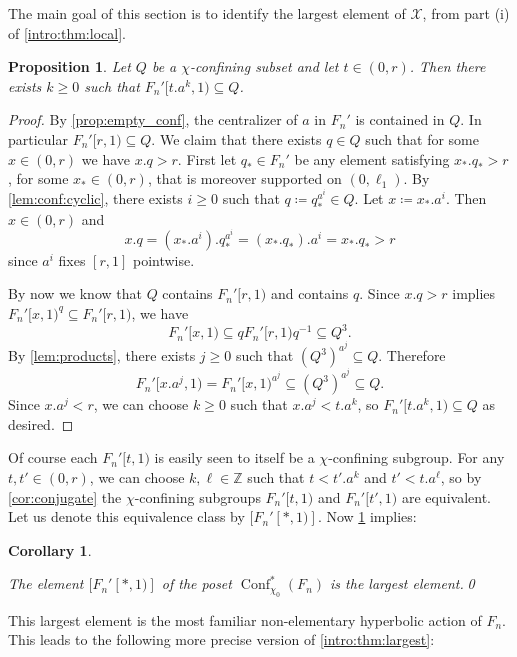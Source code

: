 \documentclass[reqno,12pt]{amsart}\setcounter{tocdepth}{1}
\newtheorem{proposition}[theorem]{Proposition}
\newtheorem{corollary}[theorem]{Corollary}
\theoremstyle{definition}
\newcommand{\Z}{\mathbb{Z}}
\DeclareMathOperator{\Conf}{Conf}
\newcommand{\X}{\mathcal{X}}
\numberwithin{equation}{section}
\begin{document}
The main goal of this section is to identify the largest element of $\X$, from part (i) of \cref{intro:thm:local}.

\begin{proposition}
\label{prop:contains}
Let $Q$ be a $\chi$-confining subset and let $t \in (0,r)$. Then there exists $k \geq 0$ such that $F_n'[t.a^k,1) \subseteq Q$.
\end{proposition}

\begin{proof}
By \cref{prop:empty_conf}, the centralizer of $a$ in $F_n'$ is contained in $Q$. In particular $F_n'[r, 1) \subseteq Q$. We claim that there exists $q \in Q$ such that for some $x \in (0,r)$ we have $x.q > r$. First let $q_* \in F_n'$ be any element satisfying $x_*.q_*>r$, for some $x_* \in (0,r)$, that is moreover supported on $(0,\ell_1)$. By \cref{lem:conf:cyclic}, there exists $i \geq 0$ such that $q \coloneqq q_*^{a^i} \in Q$. Let $x \coloneqq x_*.a^i$. Then $x \in (0,r)$ and
\[ x.q = (x_*.a^i).q_*^{a^i} = (x_*.q_*).a^i = x_*.q_* > r \]
since $a^i$ fixes $[r,1]$ pointwise.

By now we know that $Q$ contains $F_n'[r,1)$ and contains $q$. Since $x.q>r$ implies $F_n'[x,1)^q \subseteq F_n'[r,1)$, we have
\[ F_n'[x,1) \subseteq q F_n'[r,1)q^{-1} \subseteq Q^3\text{.} \]
By \cref{lem:products}, there exists $j \geq 0$ such that $(Q^3)^{a^j} \subseteq Q$. Therefore
\[
F_n'[x.a^j,1) = F_n'[x, 1)^{a^j} \subseteq (Q^3)^{a^j} \subseteq Q.
\]
Since $x.a^j < r$, we can choose $k \ge 0$ such that $x.a^j<t.a^k$, so $F_n'[t.a^k,1)\subseteq Q$ as desired.
\end{proof}

Of course each $F_n'[t,1)$ is easily seen to itself be a $\chi$-confining subgroup. For any $t,t'\in (0,r)$, we can choose $k,\ell\in\Z$ such that $t<t'.a^k$ and $t'<t.a^\ell$, so by \cref{cor:conjugate} the $\chi$-confining subgroups $F_n'[t,1)$ and $F_n'[t',1)$ are equivalent. Let us denote this equivalence class by $[F_n'[*,1)]$. Now \cref{prop:contains} implies:

\begin{corollary}
\label{cor:largest}

The element $[F_n'[*,1)]$ of the poset $\Conf^\ast_{\chi_0}(F_n)$ is the largest element.\qed
\end{corollary}

This largest element is the most familiar non-elementary hyperbolic action of $F_n$. This leads to the following more precise version of \cref{intro:thm:largest}:
\end{document}
